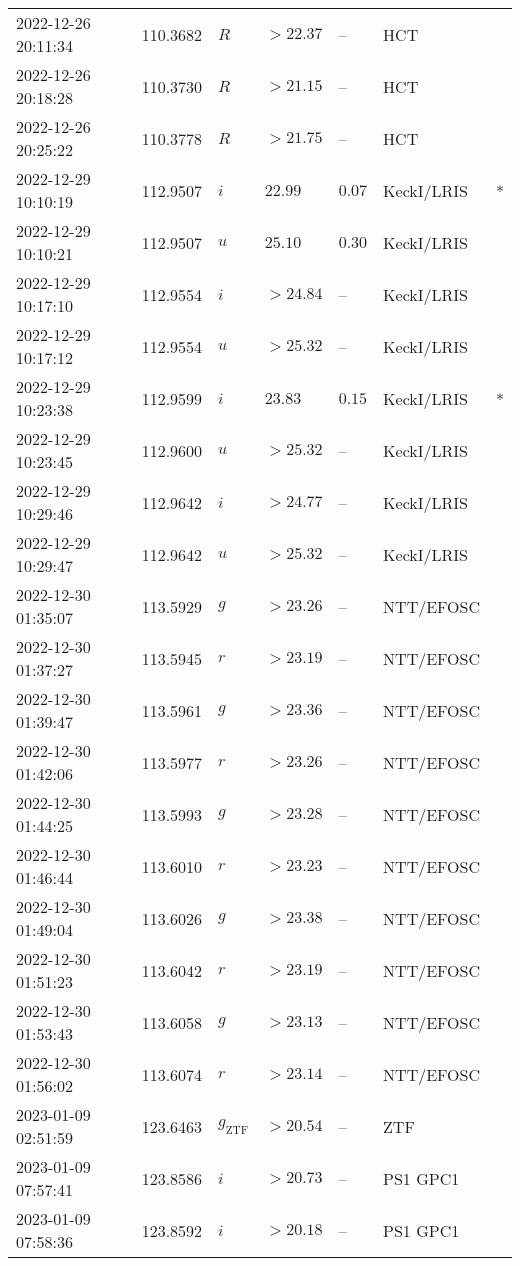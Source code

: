 \documentclass{nature_plusfigure}
\begin{document}
\begin{supplement}
\begin{center}
\begin{longtable}{lllllll}
2022-12-26 20:11:34 & 110.3682 & $R$ & $>22.37$ & -- & HCT &  \\ 
2022-12-26 20:18:28 & 110.3730 & $R$ & $>21.15$ & -- & HCT &  \\ 
2022-12-26 20:25:22 & 110.3778 & $R$ & $>21.75$ & -- & HCT &  \\ 
2022-12-29 10:10:19 & 112.9507 & $i$ & $22.99$ & $0.07$ & KeckI/LRIS & * \\ 
2022-12-29 10:10:21 & 112.9507 & $u$ & $25.10$ & $0.30$ & KeckI/LRIS &  \\ 
2022-12-29 10:17:10 & 112.9554 & $i$ & $>24.84$ & -- & KeckI/LRIS &  \\ 
2022-12-29 10:17:12 & 112.9554 & $u$ & $>25.32$ & -- & KeckI/LRIS &  \\ 
2022-12-29 10:23:38 & 112.9599 & $i$ & $23.83$ & $0.15$ & KeckI/LRIS & * \\ 
2022-12-29 10:23:45 & 112.9600 & $u$ & $>25.32$ & -- & KeckI/LRIS &  \\ 
2022-12-29 10:29:46 & 112.9642 & $i$ & $>24.77$ & -- & KeckI/LRIS &  \\ 
2022-12-29 10:29:47 & 112.9642 & $u$ & $>25.32$ & -- & KeckI/LRIS &  \\ 
2022-12-30 01:35:07 & 113.5929 & $g$ & $>23.26$ & -- & NTT/EFOSC &  \\ 
2022-12-30 01:37:27 & 113.5945 & $r$ & $>23.19$ & -- & NTT/EFOSC &  \\ 
2022-12-30 01:39:47 & 113.5961 & $g$ & $>23.36$ & -- & NTT/EFOSC &  \\ 
2022-12-30 01:42:06 & 113.5977 & $r$ & $>23.26$ & -- & NTT/EFOSC &  \\ 
2022-12-30 01:44:25 & 113.5993 & $g$ & $>23.28$ & -- & NTT/EFOSC &  \\ 
2022-12-30 01:46:44 & 113.6010 & $r$ & $>23.23$ & -- & NTT/EFOSC &  \\ 
2022-12-30 01:49:04 & 113.6026 & $g$ & $>23.38$ & -- & NTT/EFOSC &  \\ 
2022-12-30 01:51:23 & 113.6042 & $r$ & $>23.19$ & -- & NTT/EFOSC &  \\ 
2022-12-30 01:53:43 & 113.6058 & $g$ & $>23.13$ & -- & NTT/EFOSC &  \\ 
2022-12-30 01:56:02 & 113.6074 & $r$ & $>23.14$ & -- & NTT/EFOSC &  \\ 
2023-01-09 02:51:59 & 123.6463 & ${g}_\mathrm{ZTF}$ & $>20.54$ & -- & ZTF &  \\ 
2023-01-09 07:57:41 & 123.8586 & $i$ & $>20.73$ & -- & PS1 GPC1 &  \\ 
2023-01-09 07:58:36 & 123.8592 & $i$ & $>20.18$ & -- & PS1 GPC1 &  \\ 

\end{longtable}
\end{center}
\end{supplement}
\end{document}
